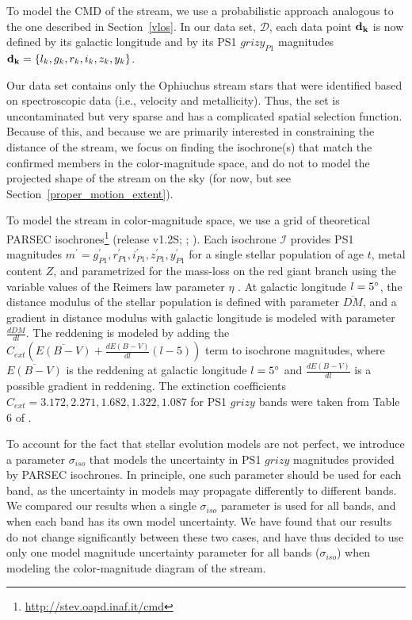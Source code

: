 \documentclass[iop]{emulateapj}
\begin{document}
To model the CMD of the stream, we use a probabilistic approach analogous to the
one described in Section~\ref{vlos}. In our data set, $\mathcal{D}$, each data
point ${\bf d_k}$ is now defined by its galactic longitude and by its PS1
$grizy_{P1}$ magnitudes ${\bf d_k}=\{l_k, g_k, r_k, i_k, z_k, y_k\}$.

Our data set contains only the Ophiuchus stream stars that were identified based
on spectroscopic data (i.e., velocity and metallicity). Thus, the set is
uncontaminated but very sparse and has a complicated spatial selection function.
Because of this, and because we are primarily interested in constraining the
distance of the stream, we focus on finding the isochrone(s) that match the
confirmed members in the color-magnitude space, and do not to model the
projected shape of the stream on the sky (for now, but see
Section~\ref{proper_motion_extent}).

To model the stream in color-magnitude space, we use a grid of theoretical
PARSEC isochrones\footnote{\url{http://stev.oapd.inaf.it/cmd}} (release v1.2S;
\citealt{bre12}; \citealt{che14}). Each isochrone $\mathcal{I}$ provides PS1
magnitudes
$m^\prime=g_{P1}^\prime,r_{P1}^\prime,i_{P1}^\prime,z_{P1}^\prime,y_{P1}^\prime$
for a single stellar population of age $t$, metal content $Z$, and parametrized
for the mass-loss on the red giant branch using the variable values of the
Reimers law parameter $\eta$ \citep{rei75, rei77}. At galactic longitude
$l=5\mbox{$^\circ$}$, the distance modulus of the stellar population is defined with
parameter $\overline{DM}$, and a gradient in distance modulus with galactic
longitude is modeled with parameter $\frac{dDM}{dl}$. The reddening is modeled
by adding the
$C_{ext}\left(\overline{E(B-V)} + \frac{d E(B-V)}{dl}\left(l-5\right)\right)$
term to isochrone magnitudes, where $\overline{E(B-V)}$ is the reddening at
galactic longitude $l=5\mbox{$^\circ$}$ and $\frac{d E(B-V)}{dl}$ is a possible
gradient in reddening. The extinction coefficients
$C_{ext}=3.172, 2.271, 1.682, 1.322,1.087$ for PS1 $grizy$ bands were taken from
Table 6 of \citet{sf11}.

To account for the fact that stellar evolution models are not perfect, we
introduce a parameter $\sigma_{iso}$ that models the uncertainty in PS1 $grizy$
magnitudes provided by PARSEC isochrones. In principle, one such parameter
should be used for each band, as the uncertainty in models may propagate
differently to different bands. We compared our results when a single
$\sigma_{iso}$ parameter is used for all bands, and when each band has its own
model uncertainty. We have found that our results do not change significantly
between these two cases, and have thus decided to use only one model magnitude
uncertainty parameter for all bands ($\sigma_{iso}$) when modeling the
color-magnitude diagram of the stream.
\end{document}
